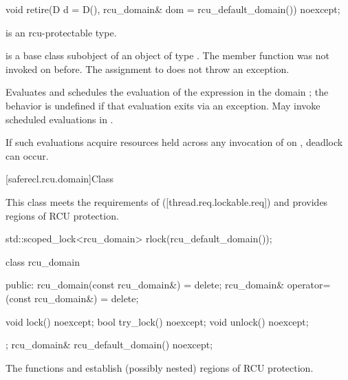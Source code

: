 \begin{itemdecl}
void retire(D d = D(), rcu_domain& dom = rcu_default_domain()) noexcept;
\end{itemdecl}

\begin{itemdescr}

\pnum
\mandates
{} is an rcu-protectable type.

\pnum
\expects
{} is a base class subobject of
an object  of type . The member function
 was not invoked on 
before. The assignment to  does not throw an
exception.

\pnum
\effects
Evaluates  and schedules the
evaluation of the expression  in
the domain ; the behavior is undefined if that evaluation
exits via an exception.
May invoke scheduled evaluations in .

\begin{note}
If such evaluations acquire resources held across any invocation of
 on , deadlock can occur.
\end{note}

\end{itemdescr}

[saferecl.rcu.domain]{Class }

This class meets the requirements of 
([thread.req.lockable.req]) and provides regions of RCU protection.

\begin{example}
\begin{codeblock}
std::scoped_lock<rcu_domain> rlock(rcu_default_domain());
\end{codeblock}
\end{example}

\begin{codeblock}
class rcu_domain {
public:
  rcu_domain(const rcu_domain&) = delete;
  rcu_domain& operator=(const rcu_domain&) = delete;

  void lock() noexcept;
  bool try_lock() noexcept;
  void unlock() noexcept;
};
rcu_domain& rcu_default_domain() noexcept;
\end{codeblock}

The functions  and  establish (possibly nested)
regions of RCU protection.

